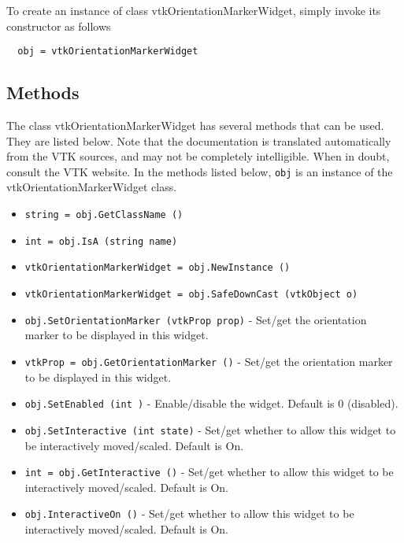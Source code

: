 To create an instance of class vtkOrientationMarkerWidget, simply
invoke its constructor as follows
\begin{verbatim}
  obj = vtkOrientationMarkerWidget
\end{verbatim}
\subsection{Methods}

The class vtkOrientationMarkerWidget has several methods that can be used.
  They are listed below.
Note that the documentation is translated automatically from the VTK sources,
and may not be completely intelligible.  When in doubt, consult the VTK website.
In the methods listed below, \verb|obj| is an instance of the vtkOrientationMarkerWidget class.
\begin{itemize}
\item  \verb|string = obj.GetClassName ()|

\item  \verb|int = obj.IsA (string name)|

\item  \verb|vtkOrientationMarkerWidget = obj.NewInstance ()|

\item  \verb|vtkOrientationMarkerWidget = obj.SafeDownCast (vtkObject o)|

\item  \verb|obj.SetOrientationMarker (vtkProp prop)| -  Set/get the orientation marker to be displayed in this widget.

\item  \verb|vtkProp = obj.GetOrientationMarker ()| -  Set/get the orientation marker to be displayed in this widget.

\item  \verb|obj.SetEnabled (int )| -  Enable/disable the widget. Default is 0 (disabled).

\item  \verb|obj.SetInteractive (int state)| -  Set/get whether to allow this widget to be interactively moved/scaled.
 Default is On.

\item  \verb|int = obj.GetInteractive ()| -  Set/get whether to allow this widget to be interactively moved/scaled.
 Default is On.

\item  \verb|obj.InteractiveOn ()| -  Set/get whether to allow this widget to be interactively moved/scaled.
 Default is On.


\end{itemize}

